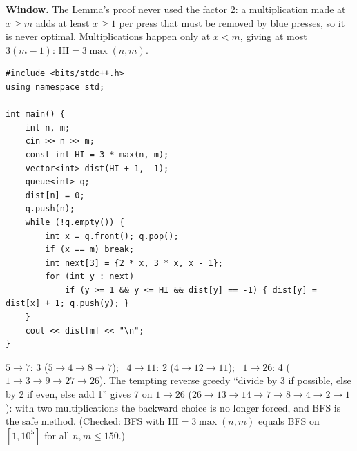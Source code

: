 \begin{solutionbox}
\textbf{Window.} The Lemma's proof never used the factor 2: a multiplication made at $x \ge m$ adds at least $x \ge 1$ per press that must be removed by blue presses, so it is never optimal. Multiplications happen only at $x < m$, giving at most $3(m-1)$: $\text{HI} = 3\max(n, m)$.
\begin{lstlisting}[style=cpp]
#include <bits/stdc++.h>
using namespace std;

int main() {
    int n, m;
    cin >> n >> m;
    const int HI = 3 * max(n, m);
    vector<int> dist(HI + 1, -1);
    queue<int> q;
    dist[n] = 0;
    q.push(n);
    while (!q.empty()) {
        int x = q.front(); q.pop();
        if (x == m) break;
        int next[3] = {2 * x, 3 * x, x - 1};
        for (int y : next)
            if (y >= 1 && y <= HI && dist[y] == -1) { dist[y] = dist[x] + 1; q.push(y); }
    }
    cout << dist[m] << "\n";
}
\end{lstlisting}
$5 \to 7$: 3 ($5\to4\to8\to7$); \ $4 \to 11$: 2 ($4\to12\to11$); \ $1 \to 26$: 4 ($1\to3\to9\to27\to26$). The tempting reverse greedy ``divide by 3 if possible, else by 2 if even, else add 1'' gives 7 on $1 \to 26$ ($26\to13\to14\to7\to8\to4\to2\to1$): with two multiplications the backward choice is no longer forced, and BFS is the safe method. (Checked: BFS with $\text{HI} = 3\max(n,m)$ equals BFS on $[1, 10^5]$ for all $n, m \le 150$.)
\end{solutionbox}

